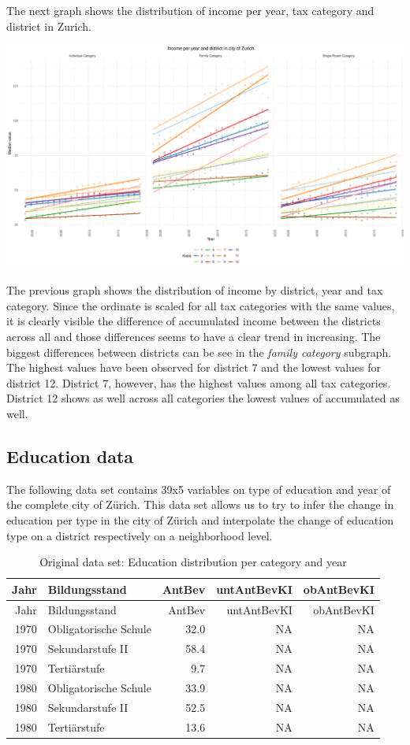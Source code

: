 \documentclass[
]{article}
\begin{document}
The next graph shows the distribution of income per year, tax category
and district in Zurich.

\includegraphics{report_files/figure-latex/plot_income-1.pdf}

The previous graph shows the distribution of income by district, year
and tax category. Since the ordinate is scaled for all tax categories
with the same values, it is clearly visible the difference of
accumulated income between the districts across all and those
differences seems to have a clear trend in increasing. The biggest
differences between districts can be see in the \emph{family category}
subgraph. The highest values have been observed for district 7 and the
lowest values for district 12. District 7, however, has the highest
values among all tax categories. District 12 shows as well across all
categories the lowest values of accumulated as well.

\newpage

\hypertarget{education-data}{%
\subsection{Education data}\label{education-data}}

The following data set contains 39x5 variables on type of education and
year of the complete city of Zürich. This data set allows us to try to
infer the change in education per type in the city of Zürich and
interpolate the change of education type on a district respectively on a
neighborhood level.

\begin{longtable}[]{@{}rlrrr@{}}
\caption{Original data set: Education distribution per category and
year}\tabularnewline
\toprule
Jahr & Bildungsstand & AntBev & untAntBevKI & obAntBevKI \\
\midrule
\endfirsthead
\toprule
Jahr & Bildungsstand & AntBev & untAntBevKI & obAntBevKI \\
\midrule
\endhead
1970 & Obligatorische Schule & 32.0 & NA & NA \\
1970 & Sekundarstufe II & 58.4 & NA & NA \\
1970 & Tertiärstufe & 9.7 & NA & NA \\
1980 & Obligatorische Schule & 33.9 & NA & NA \\
1980 & Sekundarstufe II & 52.5 & NA & NA \\
1980 & Tertiärstufe & 13.6 & NA & NA \\
\bottomrule
\end{longtable}
\end{document}
